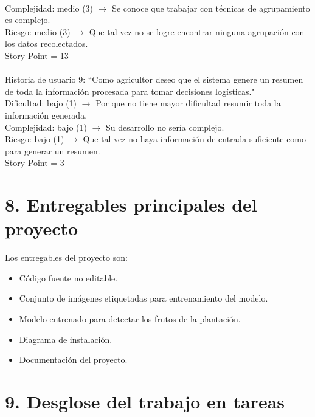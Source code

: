 \documentclass[
11pt, %
]{charter}
\begin{document}
\\
Complejidad: medio (3) $\rightarrow$ Se conoce que trabajar con técnicas de agrupamiento es complejo.
\\
Riesgo: medio (3) $\rightarrow$ Que tal vez no se logre encontrar ninguna agrupación con los datos recolectados.
\\
Story Point = 13
\\
\\
Historia de usuario 9: “Como agricultor deseo que el sistema genere un resumen de toda la información procesada para tomar decisiones logísticas."
\\
Dificultad: bajo (1) $\rightarrow$ Por que no tiene mayor dificultad resumir toda la información generada.
\\
Complejidad: bajo (1) $\rightarrow$ Su desarrollo no sería complejo.
\\
Riesgo: bajo (1) $\rightarrow$ Que tal vez no haya información de entrada suficiente como para generar un resumen.
\\
Story Point = 3


\section{8. Entregables principales del proyecto}
\label{sec:entregables}

Los entregables del proyecto son:

\begin{itemize}
	\item Código fuente no editable.
        \item Conjunto de imágenes etiquetadas para entrenamiento del modelo.
        \item Modelo entrenado para detectar los frutos de la plantación.
	\item Diagrama de instalación.
	\item Documentación del proyecto.
\end{itemize}


\section{9. Desglose del trabajo en tareas}
\label{sec:wbs}
\end{document}
